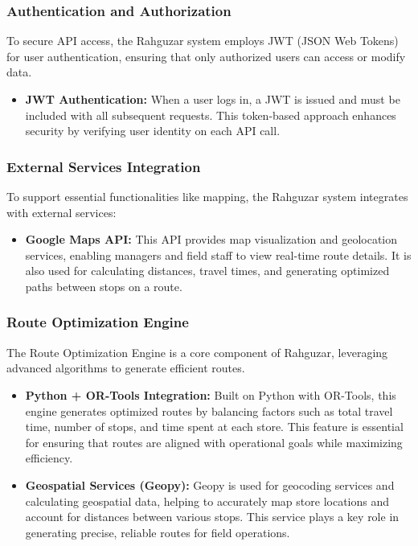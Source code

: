 \subsubsection{Authentication and Authorization}
To secure API access, the Rahguzar system employs JWT (JSON Web Tokens) for user authentication, ensuring that only authorized users can access or modify data.
\begin{itemize}
    \item \textbf{JWT Authentication:} When a user logs in, a JWT is issued and must be included with all subsequent requests. This token-based approach enhances security by verifying user identity on each API call.
\end{itemize}

\subsubsection{External Services Integration}
To support essential functionalities like mapping, the Rahguzar system integrates with external services:
\begin{itemize}
    \item \textbf{Google Maps API:} This API provides map visualization and geolocation services, enabling managers and field staff to view real-time route details. It is also used for calculating distances, travel times, and generating optimized paths between stops on a route.
\end{itemize}

\subsubsection{Route Optimization Engine}
The Route Optimization Engine is a core component of Rahguzar, leveraging advanced algorithms to generate efficient routes.
\begin{itemize}
    \item \textbf{Python + OR-Tools Integration:} Built on Python with OR-Tools, this engine generates optimized routes by balancing factors such as total travel time, number of stops, and time spent at each store. This feature is essential for ensuring that routes are aligned with operational goals while maximizing efficiency.
    \item \textbf{Geospatial Services (Geopy):} Geopy is used for geocoding services and calculating geospatial data, helping to accurately map store locations and account for distances between various stops. This service plays a key role in generating precise, reliable routes for field operations.
\end{itemize}

